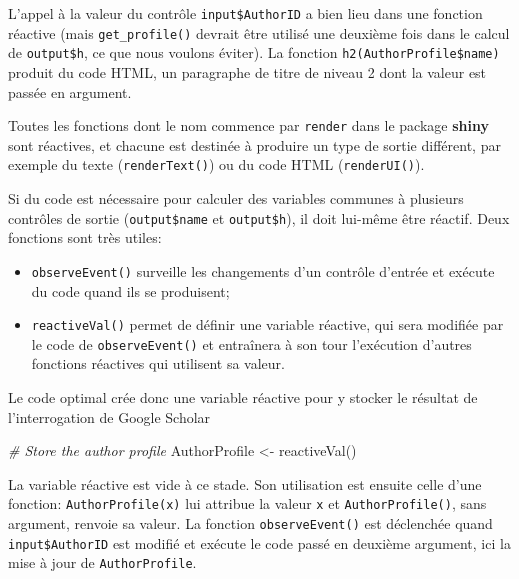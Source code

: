 \documentclass[
  11pt,
  french,
  a4paper,
  extrafontsizes,onecolumn,openright
  ]{memoir}
\newenvironment{Shaded}{\begin{snugshade}}{\end{snugshade}}
\newcommand{\CommentTok}[1]{\textcolor[rgb]{0.56,0.35,0.01}{\textit{#1}}}
\newcommand{\FunctionTok}[1]{\textcolor[rgb]{0.00,0.00,0.00}{#1}}
\newcommand{\NormalTok}[1]{#1}
\newcommand{\OtherTok}[1]{\textcolor[rgb]{0.56,0.35,0.01}{#1}}
\providecommand{\tightlist}{%
  \setlength{\itemsep}{0pt}\setlength{\parskip}{0pt}}
\begin{document}
\normalsize

L'appel à la valeur du contrôle \texttt{input\$AuthorID} a bien lieu dans une fonction réactive (mais \texttt{get\_profile()} devrait être utilisé une deuxième fois dans le calcul de \texttt{output\$h}, ce que nous voulons éviter).
La fonction \texttt{h2(AuthorProfile\$name)} produit du code HTML, un paragraphe de titre de niveau 2 dont la valeur est passée en argument.

Toutes les fonctions dont le nom commence par \texttt{render} dans le package \textbf{shiny} sont réactives, et chacune est destinée à produire un type de sortie différent, par exemple du texte (\texttt{renderText()}) ou du code HTML (\texttt{renderUI()}).

Si du code est nécessaire pour calculer des variables communes à plusieurs contrôles de sortie (\texttt{output\$name} et \texttt{output\$h}), il doit lui-même être réactif.
Deux fonctions sont très utiles:

\begin{itemize}
\tightlist
\item
  \texttt{observeEvent()} surveille les changements d'un contrôle d'entrée et exécute du code quand ils se produisent;
\item
  \texttt{reactiveVal()} permet de définir une variable réactive, qui sera modifiée par le code de \texttt{observeEvent()} et entraînera à son tour l'exécution d'autres fonctions réactives qui utilisent sa valeur.
\end{itemize}

Le code optimal crée donc une variable réactive pour y stocker le résultat de l'interrogation de Google Scholar

\scriptsize

\begin{Shaded}
\begin{Highlighting}[]
\CommentTok{\# Store the author profile}
\NormalTok{AuthorProfile }\OtherTok{\textless{}{-}} \FunctionTok{reactiveVal}\NormalTok{()}
\end{Highlighting}
\end{Shaded}

\normalsize

La variable réactive est vide à ce stade.
Son utilisation est ensuite celle d'une fonction: \texttt{AuthorProfile(x)} lui attribue la valeur \texttt{x} et \texttt{AuthorProfile()}, sans argument, renvoie sa valeur.
La fonction \texttt{observeEvent()} est déclenchée quand \texttt{input\$AuthorID} est modifié et exécute le code passé en deuxième argument, ici la mise à jour de \texttt{AuthorProfile}.
\end{document}
